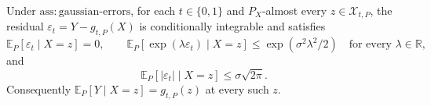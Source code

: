 Under \(\mathrm{ass:gaussian\text{-}errors}\), for each \(t\in\{0,1\}\) and \(P_X\)-almost every \(z\in\mathcal X_{t,P}\), the residual \(\varepsilon_t=Y-g_{t,P}(X)\) is conditionally integrable and satisfies
\[
 \mathbb E_P[\varepsilon_t\mid X=z]=0,\qquad
 \mathbb E_P[\exp(\lambda\varepsilon_t)\mid X=z]\le \exp(\sigma^2\lambda^2/2)\quad\text{for every }\lambda\in\mathbb R,
\]
and
\[
 \mathbb E_P[|\varepsilon_t|\mid X=z]\le \sigma\sqrt{2\pi}.
\]
Consequently \(\mathbb E_P[Y\mid X=z]=g_{t,P}(z)\) at every such \(z\).